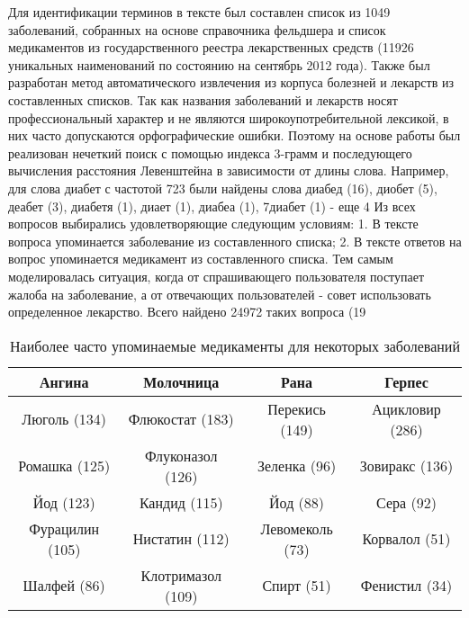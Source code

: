 ﻿\documentclass{article}
\begin{document}
Для идентификации терминов в тексте был составлен список из 1049 заболеваний, собранных на основе справочника фельдшера и список медикаментов из государственного реестра лекарственных средств (11926 уникальных наименований по состоянию на сентябрь 2012 года). Также был разработан метод автоматического извлечения из корпуса болезней и лекарств из составленных списков. Так как названия заболеваний и лекарств носят профессиональный характер и не являются широкоупотребительной лексикой, в них часто допускаются орфографические ошибки. Поэтому на основе работы \cite{BELOBORODOV2} был реализован нечеткий поиск с помощью индекса 3-грамм и последующего вычисления расстояния Левенштейна в зависимости от длины слова. Например, для слова диабет с частотой 723 были найдены слова диабед (16), диобет (5), деабет (3), диабетя (1), диает (1), диабеа (1), 7диабет (1) - еще 4%
Из всех вопросов выбирались удовлетворяющие следующим условиям:
1. В тексте вопроса упоминается заболевание из составленного списка;
2. В тексте ответов на вопрос упоминается медикамент из составленного списка.
Тем самым моделировалась ситуация, когда от спрашивающего пользователя поступает жалоба на заболевание, а от отвечающих пользователей - совет использовать определенное лекарство. Всего найдено 24972 таких вопроса (19%

\begin{table}[h]
\caption{Наиболее часто упоминаемые медикаменты для некоторых заболеваний}
\begin{center}
\begin{tabular}{|c|c|c|c|}
\hline
Ангина & Молочница & Рана & Герпес \\
\hline
Люголь (134) & Флюкостат (183) & Перекись (149) & Ацикловир (286) \\
\hline
Ромашка (125) & Флуконазол (126) & Зеленка (96) & Зовиракс (136) \\
\hline
Йод (123) & Кандид (115) & Йод (88) & Сера (92) \\
Фурацилин (105) & Нистатин (112) & Левомеколь (73) & Корвалол (51) \\
\hline
Шалфей (86) & Клотримазол (109) & Спирт (51) & Фенистил (34) \\
\hline
\end{tabular}
\end{center}
\end{table}
\end{document}
